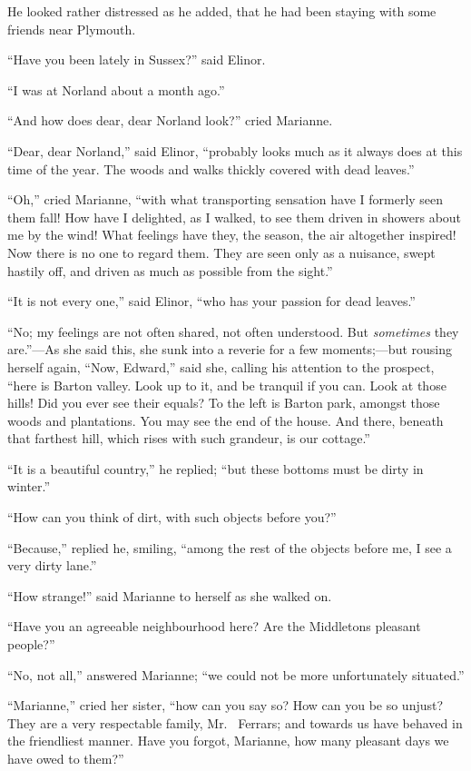 \documentclass{article}
\begin{document}
He looked rather distressed as he added, that he
had been staying with some friends near Plymouth.

``Have you been lately in Sussex?'' said Elinor.

``I was at Norland about a month ago.''

``And how does dear, dear Norland look?'' cried Marianne.

``Dear, dear Norland,'' said Elinor, ``probably looks
much as it always does at this time of the year.
The woods and walks thickly covered with dead leaves.''

``Oh,'' cried Marianne, ``with what transporting sensation
have I formerly seen them fall!  How have I delighted,
as I walked, to see them driven in showers about me
by the wind!  What feelings have they, the season, the air
altogether inspired!  Now there is no one to regard them.
They are seen only as a nuisance, swept hastily off,
and driven as much as possible from the sight.''

``It is not every one,'' said Elinor, ``who has your
passion for dead leaves.''

``No; my feelings are not often shared, not often
understood.  But \emph{sometimes} they are.''---As she said this,
she sunk into a reverie for a few moments;---but rousing
herself again, ``Now, Edward,'' said she, calling his attention
to the prospect, ``here is Barton valley.  Look up to it,
and be tranquil if you can.  Look at those hills!
Did you ever see their equals?  To the left is Barton park,
amongst those woods and plantations.  You may see the end
of the house.  And there, beneath that farthest hill,
which rises with such grandeur, is our cottage.''

``It is a beautiful country,'' he replied; ``but these
bottoms must be dirty in winter.''

``How can you think of dirt, with such objects before you?''

``Because,'' replied he, smiling, ``among the rest of the
objects before me, I see a very dirty lane.''

``How strange!'' said Marianne to herself as she walked on.

``Have you an agreeable neighbourhood here?  Are the
Middletons pleasant people?''

``No, not all,'' answered Marianne; ``we could not
be more unfortunately situated.''

``Marianne,'' cried her sister, ``how can you say so? How can
you be so unjust?  They are a very respectable family, Mr.\ %
Ferrars;
and towards us have behaved in the friendliest manner.  Have you
forgot, Marianne, how many pleasant days we have owed to them?''
\end{document}
